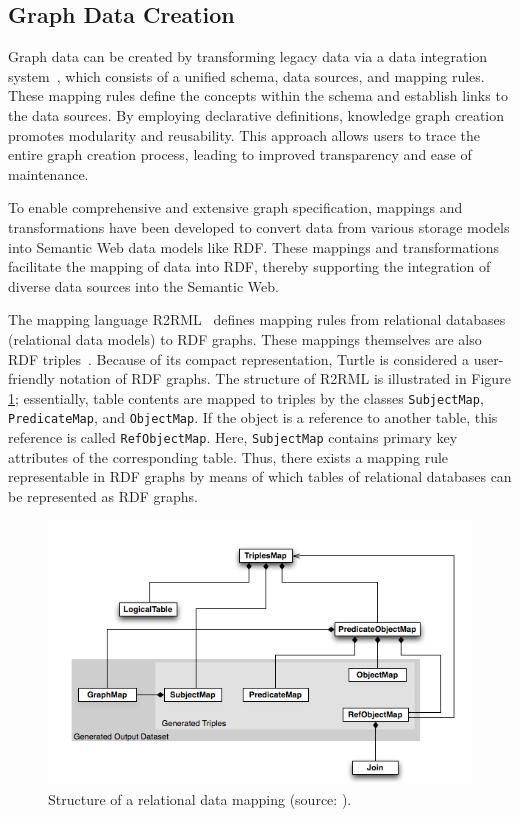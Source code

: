 \documentclass[a4paper,USenglish]{tgdk-v2021}
\begin{document}
\subsection{Graph Data Creation}
Graph data can be created by transforming legacy data via a data integration system~\cite{lenzerini2002data}, which consists of a unified schema, data sources, and mapping rules. 
These mapping rules define the concepts within the schema and establish links to the data sources.
By employing declarative definitions, knowledge graph creation promotes modularity and reusability.
This approach allows users to trace the entire graph creation process, leading to improved transparency and ease of maintenance.

To enable comprehensive and extensive graph specification, mappings and transformations have been developed to convert data from various storage models into Semantic Web data models like RDF. 
These mappings and transformations facilitate the mapping of data into RDF, thereby supporting the integration of diverse data sources into the Semantic Web.

The mapping language R2RML~\cite{W3CR2RML} defines mapping rules from relational databases (relational data models) to RDF graphs.
These mappings themselves are also RDF triples~\cite{W3TURTLE}. 
Because of its compact representation, Turtle is considered a user-friendly notation of RDF graphs.
The structure of R2RML is illustrated in Figure \ref{fig:r2rml}; essentially, table contents are mapped to triples by the classes \texttt{SubjectMap}, \texttt{PredicateMap}, and \texttt{ObjectMap}.
If the object is a reference to another table, this reference is called \texttt{RefObjectMap}. 
Here, \texttt{SubjectMap} contains primary key attributes of the corresponding table. 
Thus, there exists a mapping rule representable in RDF graphs by means of which tables of relational databases can be represented as RDF graphs.

\begin{figure}[ht]
  \centering
  \includegraphics[width=1\textwidth]{figs/R2RML.PNG}
\caption{Structure of a relational data mapping (source: \cite{W3CR2RML}).}\label{fig:r2rml}
\end{figure}
 
\end{document}
